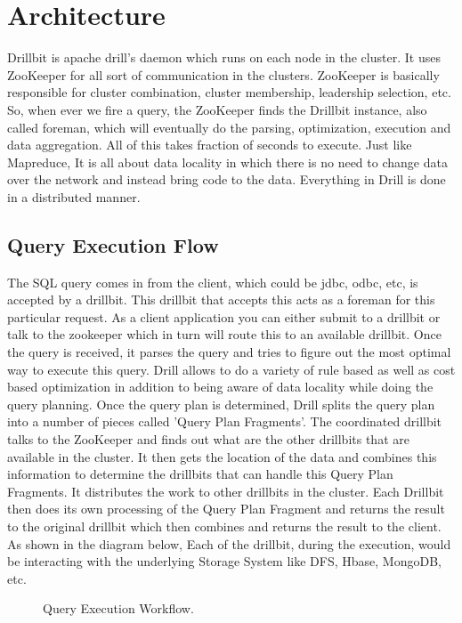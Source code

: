 \documentclass[9pt,twocolumn,twoside]{styles/osajnl}
\begin{document}
\section{Architecture}
Drillbit \cite{Drillbit} is apache drill's daemon which runs on each node in the cluster. It uses ZooKeeper for all sort of communication in the clusters. ZooKeeper is basically responsible for cluster combination, cluster membership, leadership selection, etc. So, when ever we fire a query, the ZooKeeper finds the Drillbit instance, also called foreman, which will eventually do the parsing, optimization, execution and data aggregation. All of this takes fraction of seconds to execute. Just like Mapreduce, It is all about data locality in which there is no need to change data over the network and instead bring code to the data. Everything in Drill is done in a distributed manner.

\subsection{Query Execution Flow}
The SQL query comes in from the client, which could be jdbc, odbc, etc, is accepted by a drillbit. This drillbit that accepts this acts as a foreman for this particular request. As a client application you can either submit to a drillbit or talk to the zookeeper which in turn will route this to an available drillbit. Once the query is received, it parses the query and tries to figure out the most optimal way to execute this query. Drill allows to do a variety of rule based as well as cost based optimization in addition to being aware of data locality while doing the query planning. Once the query plan is determined, Drill splits the query plan into a number of pieces called 'Query Plan Fragments'. The coordinated drillbit talks to the ZooKeeper and finds out what are the other drillbits that are available in the cluster. It then gets the location of the data and combines this information to determine the drillbits that can handle this Query Plan Fragments. It distributes the work to other drillbits in the cluster. Each Drillbit then does its own processing of the Query Plan Fragment and returns the result to the original drillbit which then combines and returns the result to the client. As shown in the diagram below, Each of the drillbit, during the execution, would be interacting with the underlying Storage System like DFS, Hbase, MongoDB, etc.

\begin{figure}[htbp]
	\centering
	\caption{Query Execution Workflow.}
	\label{fig:Drill-arch}
\end{figure}
\end{document}
